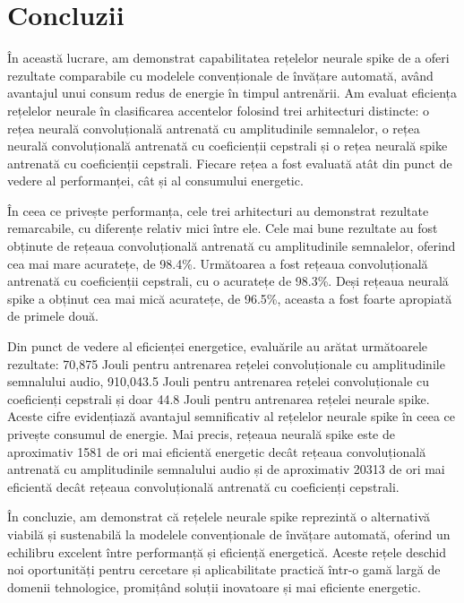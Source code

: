 \chapter{Concluzii}

În această lucrare, am demonstrat capabilitatea rețelelor neurale spike de a oferi rezultate comparabile cu modelele convenționale de învățare automată, având avantajul unui consum redus de energie în timpul antrenării. Am evaluat eficiența rețelelor neurale în clasificarea accentelor folosind trei arhitecturi distincte: o rețea neurală convoluțională antrenată cu amplitudinile semnalelor, o rețea neurală convoluțională antrenată cu coeficienții cepstrali și o rețea neurală spike antrenată cu coeficienții cepstrali. Fiecare rețea a fost evaluată atât din punct de vedere al performanței, cât și al consumului energetic.

În ceea ce privește performanța, cele trei arhitecturi au demonstrat rezultate remarcabile, cu diferențe relativ mici între ele. Cele mai bune rezultate au fost obținute de rețeaua convoluțională antrenată cu amplitudinile semnalelor, oferind cea mai mare acuratețe, de 98.4\%. Următoarea a fost rețeaua convoluțională antrenată cu coeficienții cepstrali, cu o acuratețe de 98.3\%. Deși rețeaua neurală spike a obținut cea mai mică acuratețe, de 96.5\%, aceasta a fost foarte apropiată de primele două.

Din punct de vedere al eficienței energetice, evaluările au arătat următoarele rezultate: 70,875 Jouli pentru antrenarea rețelei convoluționale cu amplitudinile semnalului audio, 910,043.5 Jouli pentru antrenarea rețelei convoluționale cu coeficienți cepstrali și doar 44.8 Jouli pentru antrenarea rețelei neurale spike. Aceste cifre evidențiază avantajul semnificativ al rețelelor neurale spike în ceea ce privește consumul de energie. Mai precis, rețeaua neurală spike este de aproximativ 1581 de ori mai eficientă energetic decât rețeaua convoluțională antrenată cu amplitudinile semnalului audio și de aproximativ 20313 de ori mai eficientă decât rețeaua convoluțională antrenată cu coeficienți cepstrali.

În concluzie, am demonstrat că rețelele neurale spike reprezintă o alternativă viabilă și sustenabilă la modelele convenționale de învățare automată, oferind un echilibru excelent între performanță și eficiență energetică. Aceste rețele deschid noi oportunități pentru cercetare și aplicabilitate practică într-o gamă largă de domenii tehnologice, promițând soluții inovatoare și mai eficiente energetic.





